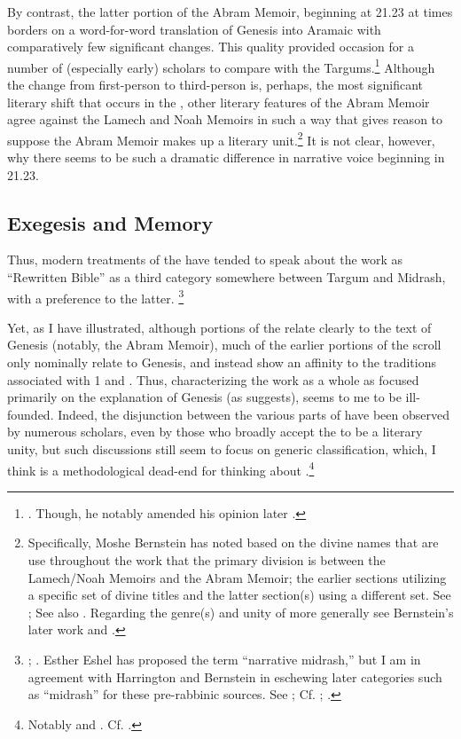 

By contrast, the latter portion of the Abram Memoir, beginning at 21.23 at times borders on a word-for-word translation of Genesis into Aramaic with comparatively few significant changes. This quality provided occasion for a number of (especially early) scholars to compare \ga with the Targums.\footnote{\cite[193]{black1983}. Though, he notably amended his opinion later \cite*{black_black-fohrer1968}.} Although the change from first-person to third-person is, perhaps, the most significant literary shift that occurs in the \ga, other literary features of the Abram Memoir agree against the Lamech and Noah Memoirs in such a way that gives reason to suppose the Abram Memoir makes up a literary unit.\footnote{Specifically, Moshe Bernstein has noted based on the divine names that are use throughout the work that the primary division is between the Lamech/Noah Memoirs and the Abram Memoir; the earlier sections utilizing a specific set of divine titles and the latter section(s) using a different set. See \cite{bernstein_jbl2009}; See also \cite[97]{falk2007}. Regarding the genre(s) and unity of \ga more generally see Bernstein's later work \cite*{bernstein_berthelot-etal2010} and \cite*{bernstein_as2010}.} It is not clear, however, why there seems to be such a dramatic difference in narrative voice beginning in 21.23.

\subsection{Exegesis and Memory}

Thus, modern treatments of the \ga have tended to speak about the work as ``Rewritten Bible'' as a third category somewhere between Targum and Midrash, with a preference to the latter.%
%
\footnote{\cite{evans_revq1988}; \cite[19]{fitzmyer2004}. Esther Eshel has proposed the term ``narrative midrash,'' but I am in agreement with Harrington and Bernstein in eschewing later categories such as ``midrash'' for these pre-rabbinic sources. See \cite[182]{eshel_roitman-etal2011}; Cf. \cite[242]{harrington_kraft-nickelsburg1986}; \cite[327 n. 33; 328--329]{bernstein_berthelot-etal2010}.}

Yet, as I have illustrated, although portions of the \ga relate clearly to the text of Genesis (notably, the Abram Memoir), much of the earlier portions of the scroll only nominally relate to Genesis, and instead show an affinity to the traditions associated with 1 \enoch and \jub. Thus, characterizing the work as a whole as focused primarily on the explanation of Genesis (as \vermes suggests), seems to me to be ill-founded. Indeed, the disjunction between the various parts of \ga have been observed by numerous scholars, even by those who broadly accept the \ga to be a literary unity, but such discussions still seem to focus on generic classification, which, I think is a methodological dead-end for thinking about \ga.\footnote{Notably \cite{bernstein_as2010} and \cite{falk2007}. Cf. \cite{eshel_roitman-etal2011}.}

